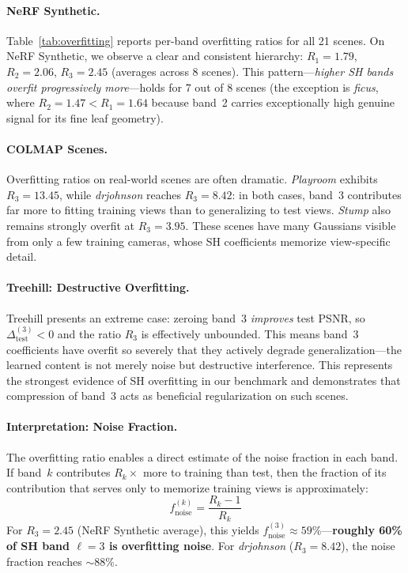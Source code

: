 \documentclass[sigconf,review]{acmart}
\newcommand{\R}[1]{R_{#1}}
\begin{document}
\paragraph{NeRF Synthetic.}
Table~\ref{tab:overfitting} reports per-band overfitting ratios for all 21 scenes.
On NeRF Synthetic, we observe a clear and consistent hierarchy: $\R{1}{=}1.79$, $\R{2}{=}2.06$, $\R{3}{=}2.45$ (averages across 8 scenes).
This pattern---\emph{higher SH bands overfit progressively more}---holds for 7 out of 8 scenes (the exception is \textit{ficus}, where $\R{2}{=}1.47 < \R{1}{=}1.64$ because band~2 carries exceptionally high genuine signal for its fine leaf geometry).

\paragraph{COLMAP Scenes.}
Overfitting ratios on real-world scenes are often dramatic.
\textit{Playroom} exhibits $\R{3}{=}13.45$, while \textit{drjohnson} reaches $\R{3}{=}8.42$: in both cases, band~3 contributes far more to fitting training views than to generalizing to test views.
\textit{Stump} also remains strongly overfit at $\R{3}{=}3.95$.
These scenes have many Gaussians visible from only a few training cameras, whose SH coefficients memorize view-specific detail.

\paragraph{Treehill: Destructive Overfitting.}
Treehill presents an extreme case: zeroing band~3 \emph{improves} test PSNR, so $\Delta_{\text{test}}^{(3)}<0$ and the ratio $\R{3}$ is effectively unbounded.
This means band~3 coefficients have overfit so severely that they actively degrade generalization---the learned content is not merely noise but destructive interference.
This represents the strongest evidence of SH overfitting in our benchmark and demonstrates that compression of band~3 acts as beneficial regularization on such scenes.

\paragraph{Interpretation: Noise Fraction.}
The overfitting ratio enables a direct estimate of the noise fraction in each band.
If band~$k$ contributes $\R{k}{\times}$ more to training than test, then the fraction of its contribution that serves only to memorize training views is approximately:
\begin{equation}
  f_{\text{noise}}^{(k)} = \frac{\R{k} - 1}{\R{k}}
  \label{eq:noise_frac}
\end{equation}
For $\R{3}{=}2.45$ (NeRF Synthetic average), this yields $f_{\text{noise}}^{(3)} \approx 59\%$---\textbf{roughly 60\% of SH band $\ell{=}3$ is overfitting noise}.
For \textit{drjohnson} ($\R{3}{=}8.42$), the noise fraction reaches ${\sim}88\%$.
\end{document}
